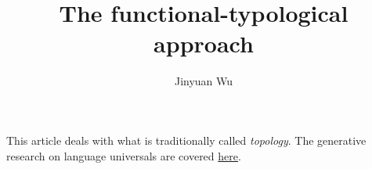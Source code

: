 \documentclass[a4paper]{article}
\title{The functional-typological approach}
\author{Jinyuan Wu}
\begin{document}
\maketitle

This article deals with what is traditionally called \emph{topology}. The generative research on language universals
are covered \href{language-universal.pdf}{here}.
\end{document}
